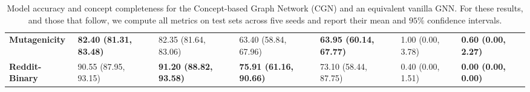 \documentclass[withindex,glossary]{cam-thesis}
\theoremstyle{plain}
\theoremstyle{definition}
\theoremstyle{remark}
\begin{document}
\begin{table*}[!t]
{\begin{tabular}{lllllll}
\textbf{Mutagenicity}  & \textbf{82.40 (81.31, 83.48)}         & 82.35 (81.64, 83.06)                          & 63.40 (58.84, 67.96)            & \textbf{63.95 (60.14, 67.77)}                    & 1.00 (0.00, 3.78)                     & \textbf{0.60 (0.00, 2.27)}                    \\
\textbf{Reddit-Binary} & 90.55 (87.95, 93.15)                  & \textbf{91.20 (88.82, 93.58)}                 & \textbf{75.91 (61.16, 90.66)}             & 73.10 (58.44, 87.75)                  & 0.40 (0.00, 1.51)                     & \textbf{0.00 (0.00, 0.00)}                   \\ \bottomrule
\end{tabular}%
}
\caption{Model accuracy and concept completeness for the Concept-based Graph Network (CGN) and an equivalent vanilla GNN. For these results, and those that follow, we compute all metrics on test sets across five seeds and report their mean and $95\%$ confidence intervals.}
    \label{fig:accuracy}
\end{table*}


\end{document}
